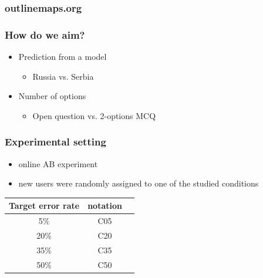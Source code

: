 \documentclass[bigger]{beamer}
\begin{document}
\begin{frame}
  \frametitle{outlinemaps.org}
	\noindent{}
\end{frame}

\begin{frame}
	\frametitle{How do we aim?}
	\begin{itemize}
		\item Prediction from a model
    \begin{itemize}
      \item Russia vs. Serbia
    \end{itemize}
		\item Number of options
    \begin{itemize}
      \item Open question vs. 2-options MCQ
    \end{itemize}
	\end{itemize}
\end{frame}

\begin{frame}
  \frametitle{Experimental setting}
	\begin{itemize}
		\item online AB experiment
		\item new users were randomly assigned to one of the studied conditions
	\end{itemize}
	\begin{center}
		\begin{tabular}{ccc}
			\textbf{Target error rate} & \textbf{notation} \\
			\toprule
			 5\% & C05 \\
			 20\%   & C20 \\
			 35\% & C35 \\
			 50\%   & C50 \\
			\bottomrule
		\end{tabular}
	\end{center}
\end{frame}
\end{document}
